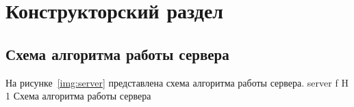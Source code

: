 \chapter{Конструкторский раздел}

\section{Схема алгоритма работы сервера}

На рисунке~\ref{img:server} представлена схема алгоритма работы сервера.
	{server}
	{f}
	{H}
	{1\textwidth}
	{Схема алгоритма работы сервера}